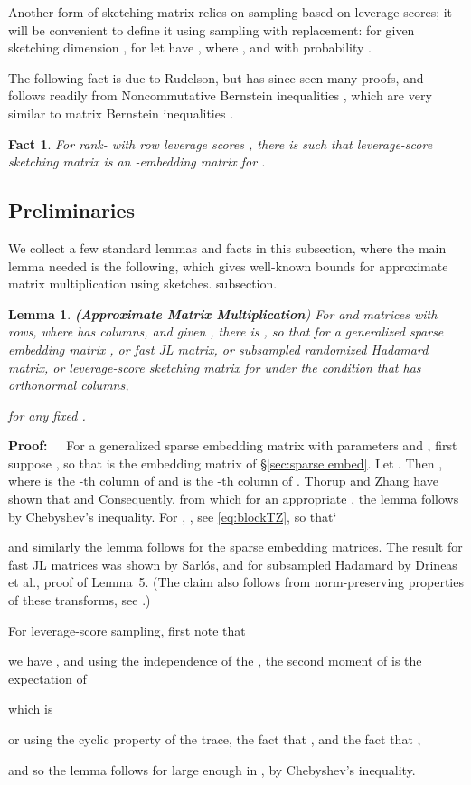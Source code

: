 \documentclass{sig-alternate}
\newtheorem{lemma}[theorem]{Lemma}
\newtheorem{fact}[theorem]{Fact}
\def\FullBox{\hbox{\vrule width 8pt height 8pt depth 0pt}}
\def\qed{\ifmmode\qquad\FullBox\else{\unskip\nobreak\hfil
\penalty50\hskip1em\null\nobreak\hfil\FullBox
\parfillskip=0pt\finalhyphendemerits=0\endgraf}\fi}
\newenvironment{proof}{\begin{trivlist} \item {\bf Proof:~~}}
  {\qed\end{trivlist}}
\begin{document}
Another form of sketching matrix relies on sampling based on leverage scores; it
will be convenient to define it using sampling with replacement: for 
given sketching dimension , for  let  have
, where ,
and  with probability .


The following fact is due to Rudelson\cite{Rudelson}, but has since seen many proofs,
and follows readily from Noncommutative Bernstein inequalities \cite{Recht},
which are very similar to matrix Bernstein inequalities \cite{Zouzias}.

\begin{fact}\label{fact:lev embed}
For rank-  with row leverage scores ,
there is  such that leverage-score sketching matrix  is
an -embedding matrix for .
\end{fact}

\subsection{Preliminaries}

We collect a few standard lemmas and facts in this
\ifSTOC
subsection, where the main lemma needed is the following,
which gives well-known bounds for approximate matrix multiplication
using sketches.
\else
subsection.
\fi \begin{lemma}\label{lem:tail}{\bf (Approximate Matrix Multiplication})
For  and  matrices with  rows, where  has  columns, and given
, there is ,
so that for 
a  generalized sparse embedding matrix ,
or  fast JL matrix, or  subsampled randomized Hadamard matrix,
or leverage-score sketching matrix for  under the condition
that  has orthonormal columns,

for any fixed .
\end{lemma}

\ifSTOC\else
\begin{proof}
For a generalized sparse embedding
matrix with parameters  and , first suppose ,
so that  is the embedding matrix of \S\ref{sec:sparse embed}.
Let . Then , where  is the -th column of 
and  is the -th column of . Thorup and Zhang \cite{tz04} have shown that  
and  Consequently, 
 from which
for an appropriate , the lemma follows by Chebyshev's inequality.
For , ,
see \eqref{eq:blockTZ},
so that`

and similarly the lemma follows for the sparse embedding matrices.
The result for fast JL matrices was shown by Sarl{\'o}s\cite{s06},
and for subsampled Hadamard by Drineas et al.\cite{dmms11}, proof of Lemma~5.
(The claim also follows from norm-preserving properties of these
transforms, see \cite{kn10}.)

For leverage-score sampling, first note that

we have ,
and using the independence of the ,
the second moment of 
is the expectation of

which is

or using the cyclic property of the trace, the fact that , and
the fact that ,

and so the lemma follows for large enough  in ,
by Chebyshev's inequality.
\end{proof}
\end{document}
